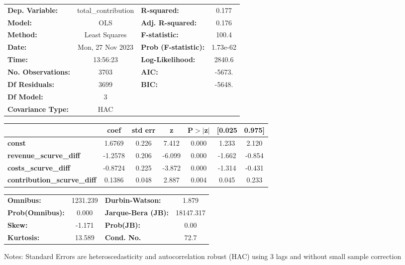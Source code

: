 \begin{center}
\begin{tabular}{lclc}
\toprule
\textbf{Dep. Variable:}             & total\_contribution & \textbf{  R-squared:         } &     0.177   \\
\textbf{Model:}                     &         OLS         & \textbf{  Adj. R-squared:    } &     0.176   \\
\textbf{Method:}                    &    Least Squares    & \textbf{  F-statistic:       } &     100.4   \\
\textbf{Date:}                      &   Mon, 27 Nov 2023  & \textbf{  Prob (F-statistic):} &  1.73e-62   \\
\textbf{Time:}                      &       13:56:23      & \textbf{  Log-Likelihood:    } &    2840.6   \\
\textbf{No. Observations:}          &          3703       & \textbf{  AIC:               } &    -5673.   \\
\textbf{Df Residuals:}              &          3699       & \textbf{  BIC:               } &    -5648.   \\
\textbf{Df Model:}                  &             3       & \textbf{                     } &             \\
\textbf{Covariance Type:}           &         HAC         & \textbf{                     } &             \\
\bottomrule
\end{tabular}
\begin{tabular}{lcccccc}
                                    & \textbf{coef} & \textbf{std err} & \textbf{z} & \textbf{P$> |$z$|$} & \textbf{[0.025} & \textbf{0.975]}  \\
\midrule
\textbf{const}                      &       1.6769  &        0.226     &     7.412  &         0.000        &        1.233    &        2.120     \\
\textbf{revenue\_scurve\_diff}      &      -1.2578  &        0.206     &    -6.099  &         0.000        &       -1.662    &       -0.854     \\
\textbf{costs\_scurve\_diff}        &      -0.8724  &        0.225     &    -3.872  &         0.000        &       -1.314    &       -0.431     \\
\textbf{contribution\_scurve\_diff} &       0.1386  &        0.048     &     2.887  &         0.004        &        0.045    &        0.233     \\
\bottomrule
\end{tabular}
\begin{tabular}{lclc}
\textbf{Omnibus:}       & 1231.239 & \textbf{  Durbin-Watson:     } &     1.879  \\
\textbf{Prob(Omnibus):} &   0.000  & \textbf{  Jarque-Bera (JB):  } & 18147.317  \\
\textbf{Skew:}          &  -1.171  & \textbf{  Prob(JB):          } &      0.00  \\
\textbf{Kurtosis:}      &  13.589  & \textbf{  Cond. No.          } &      72.7  \\
\bottomrule
\end{tabular}
\end{center}

Notes: \newline
 [1] Standard Errors are heteroscedasticity and autocorrelation robust (HAC) using 3 lags and without small sample correction